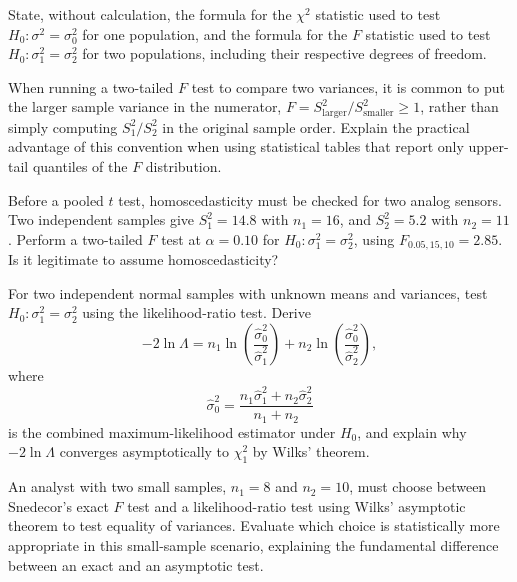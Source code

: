 \begin{problema}\label{prob:246a30e}
State, without calculation, the formula for the $\chi^2$ statistic used to test $H_0:\sigma^2=\sigma_0^2$ for one population, and the formula for the $F$ statistic used to test $H_0:\sigma_1^2=\sigma_2^2$ for two populations, including their respective degrees of freedom.
\end{problema}

\begin{problema}\label{prob:0a7aead}
When running a two-tailed $F$ test to compare two variances, it is common to put the larger sample variance in the numerator, $F=S_{\text{larger}}^2/S_{\text{smaller}}^2\ge1$, rather than simply computing $S_1^2/S_2^2$ in the original sample order. Explain the practical advantage of this convention when using statistical tables that report only upper-tail quantiles of the $F$ distribution.
\end{problema}

\begin{problema}\label{prob:682c2b2}
Before a pooled $t$ test, homoscedasticity must be checked for two analog sensors. Two independent samples give $S_1^2=14.8$ with $n_1=16$, and $S_2^2=5.2$ with $n_2=11$. Perform a two-tailed $F$ test at $\alpha=0.10$ for $H_0:\sigma_1^2=\sigma_2^2$, using $F_{0.05,15,10}=2.85$. Is it legitimate to assume homoscedasticity?
\end{problema}

\begin{problema}\label{prob:120019a}
For two independent normal samples with unknown means and variances, test $H_0:\sigma_1^2=\sigma_2^2$ using the likelihood-ratio test. Derive
\[
	-2\ln\Lambda
	=n_1\ln\left(\frac{\hat\sigma_0^2}{\hat\sigma_1^2}\right)
	+n_2\ln\left(\frac{\hat\sigma_0^2}{\hat\sigma_2^2}\right),
\]
where
\[
	\hat\sigma_0^2=\frac{n_1\hat\sigma_1^2+n_2\hat\sigma_2^2}{n_1+n_2}
\]
is the combined maximum-likelihood estimator under $H_0$, and explain why $-2\ln\Lambda$ converges asymptotically to $\chi^2_1$ by Wilks' theorem.
\end{problema}

\begin{problema}\label{prob:9db6e94}
An analyst with two small samples, $n_1=8$ and $n_2=10$, must choose between Snedecor's exact $F$ test and a likelihood-ratio test using Wilks' asymptotic theorem to test equality of variances. Evaluate which choice is statistically more appropriate in this small-sample scenario, explaining the fundamental difference between an exact and an asymptotic test.
\end{problema}

